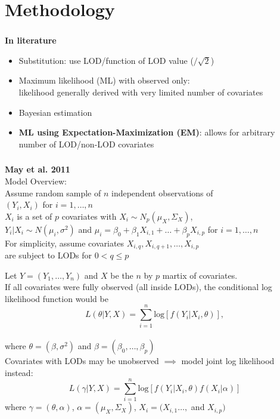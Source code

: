 \documentclass[xcolor=dvipsnames]{beamer}
\begin{document}
\section{Methodology}
\begin{frame}
\frametitle{\insertsectionhead}
\textbf{In literature}
\begin{itemize}
\item Substitution: use LOD/function of LOD value ($/\sqrt{2}$) \cite{nie_2012}
\item Maximum likelihood (ML) with observed only:\\
likelihood generally derived with very limited number of covariates  \cite{lynn_2001, cole_2009, nie_2012}
\item Bayesian estimation \cite{wu_2012}
\item \textbf{ML using Expectation-Maximization (EM)}: allows for arbitrary number of LOD/non-LOD covariates \cite{may_2011}
\end{itemize}
\end{frame}

\begin{frame}
\frametitle{\insertsectionhead}
\textbf{May et al. 2011}\\
\vspace{0.5cm}
Model Overview:\\
Assume random sample of $n$ independent observations of\\
$(Y_i, X_i)$ for $i=1,\ldots,n$\\
$X_i$ is a set of $p$ covariates with $X_i \sim N_p(\mu_X, \Sigma_X)$,\\
$Y_i|X_i \sim N(\mu_i, \sigma^2)$ and $\mu_i=\beta_0+\beta_1X_{i,1}+\ldots+\beta_pX_{i,p}$ for $i=1,\ldots,n$\\ 
\vspace{0.5cm}
For simplicity, assume covariates $X_{i,q}, X_{i,q+1}, \ldots, X_{i,p}$\\
are subject to LODs for $0<q \leq p$
\end{frame}

\begin{frame}
Let $Y=(Y_1, \ldots, Y_n)$ and $X$ be the $n$ by $p$ martix of covariates.\\
If all covariates were fully observed (all inside LODs), the conditional log likelihood function would be\\
$$L(\theta | Y, X) = \sum_{i=1}^n \textrm{log}[f(Y_i | X_i, \theta)],$$\\ where $\theta = (\beta, \sigma^2)$ and $\beta=(\beta_0, \dots, \beta_p)$\\
\vspace{0.5cm}
Covariates with LODs may be unobserved $\implies$ model joint log likelihood instead:\\
$$L(\gamma | Y, X) = \sum_{i=1}^n \textrm{log}[f(Y_i | X_i, \theta) f(X_i | \alpha)]$$ where $\gamma=(\theta, \alpha)$, $\alpha=(\mu_X, \Sigma_X)$, $X_i=(X_{i,1} \ldots,$ and $X_{i,p})$
\end{frame}
\end{document}
